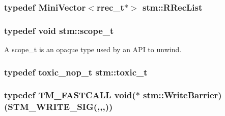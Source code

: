 \hypertarget{namespacestm_afad5b3d1a775f6e65cd1e675ba984839}{
\subsubsection[{R\-Rec\-List}]{\setlength{\rightskip}{0pt plus 5cm}typedef {\bf Mini\-Vector}$<${\bf rrec\-\_\-t}$\ast$$>$ stm\-::\-R\-Rec\-List}}\label{namespacestm_afad5b3d1a775f6e65cd1e675ba984839}
\hypertarget{namespacestm_a91badf88c88aacc831b01a315435a255}{
\subsubsection[{scope\-\_\-t}]{\setlength{\rightskip}{0pt plus 5cm}typedef void stm\-::scope\-\_\-t}}\label{namespacestm_a91badf88c88aacc831b01a315435a255}
A scope\-\_\-t is an opaque type used by an A\-P\-I to unwind. \hypertarget{namespacestm_a1a3981a9b82aa51afd56d191ca1e3984}{
\subsubsection[{toxic\-\_\-t}]{\setlength{\rightskip}{0pt plus 5cm}typedef {\bf toxic\-\_\-nop\-\_\-t} stm\-::toxic\-\_\-t}}\label{namespacestm_a1a3981a9b82aa51afd56d191ca1e3984}
\hypertarget{namespacestm_a90bdf03fe1fd826eba4bc9321e318798}{
\subsubsection[{Write\-Barrier}]{\setlength{\rightskip}{0pt plus 5cm}typedef {\bf T\-M\-\_\-\-F\-A\-S\-T\-C\-A\-L\-L} void($\ast$ stm\-::\-Write\-Barrier)({\bf S\-T\-M\-\_\-\-W\-R\-I\-T\-E\-\_\-\-S\-I\-G}(,,,))}}\label{namespacestm_a90bdf03fe1fd826eba4bc9321e318798}


